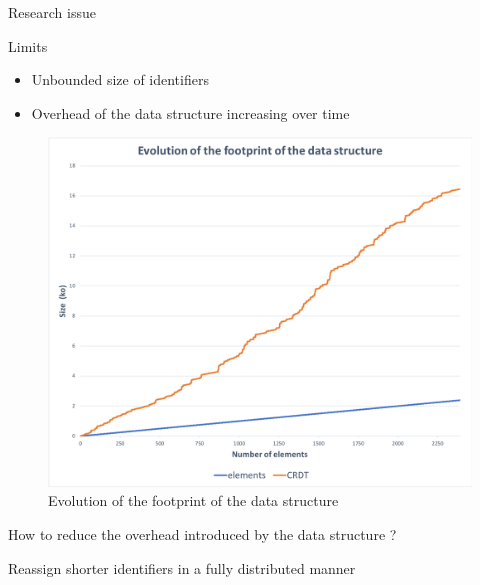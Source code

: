 \documentclass[10pt]{beamer}
\begin{document}
\begin{frame}{Research issue}
  \begin{alertblock}{Limits}
    \begin{itemize}
      \item Unbounded size of identifiers
      \item Overhead of the data structure increasing over time
    \end{itemize}
  \end{alertblock}

  \begin{figure}
    \includegraphics[scale=0.22]{img/footprint.png}
    \caption{Evolution of the footprint of the data structure}
  \end{figure}
\end{frame}

\begin{frame}[standout]
  \alert{How to reduce the overhead introduced by the data structure ?}

  \bigskip
  \pause

  Reassign shorter identifiers in a fully distributed manner
\end{frame}
\end{document}
